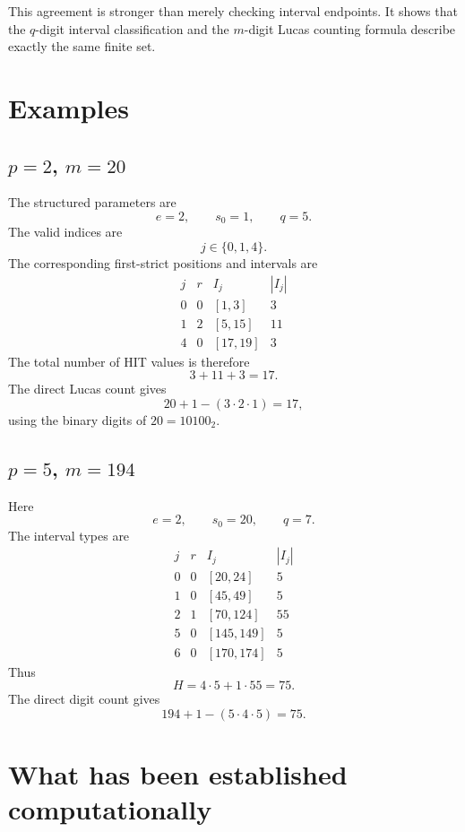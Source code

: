 \documentclass[11pt,a4paper]{article}
\theoremstyle{definition}
\theoremstyle{remark}
\begin{document}
This agreement is stronger than merely checking interval endpoints.  It shows that the $q$-digit interval classification and the $m$-digit Lucas counting formula describe exactly the same finite set.

\section{Examples}

\subsection{$p=2$, $m=20$}

The structured parameters are
\[
 e=2,
 \qquad
 s_0=1,
 \qquad
 q=5.
\]
The valid indices are
\[
 j\in\{0,1,4\}.
\]
The corresponding first-strict positions and intervals are
\[
\begin{array}{c|c|c|c}
 j&r&I_j&|I_j|\\
\hline
 0&0&[1,3]&3\\
 1&2&[5,15]&11\\
 4&0&[17,19]&3
\end{array}
\]
The total number of HIT values is therefore
\[
3+11+3=17.
\]
The direct Lucas count gives
\[
20+1-(3\cdot2\cdot1)=17,
\]
using the binary digits of $20=10100_2$.

\subsection{$p=5$, $m=194$}

Here
\[
 e=2,
 \qquad
 s_0=20,
 \qquad
 q=7.
\]
The interval types are
\[
\begin{array}{c|c|c|c}
 j&r&I_j&|I_j|\\
\hline
0&0&[20,24]&5\\
1&0&[45,49]&5\\
2&1&[70,124]&55\\
5&0&[145,149]&5\\
6&0&[170,174]&5
\end{array}
\]
Thus
\[
H=4\cdot5+1\cdot55=75.
\]
The direct digit count gives
\[
194+1-(5\cdot4\cdot5)=75.
\]

\section{What has been established computationally}
\end{document}
